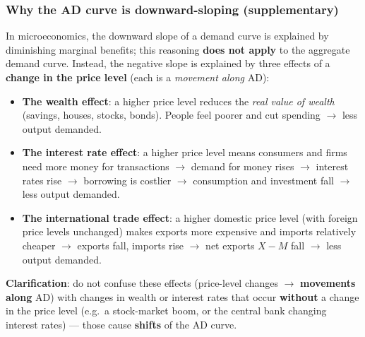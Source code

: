 \subsubsection*{Why the AD curve is downward-sloping (supplementary)}
In microeconomics, the downward slope of a demand curve is explained by diminishing marginal benefits; this reasoning \textbf{does not apply} to the aggregate demand curve. Instead, the negative slope is explained by three effects of a \textbf{change in the price level} (each is a \textit{movement along} AD):
\begin{itemize}
  \item \textbf{The wealth effect}: a higher price level reduces the \textit{real value of wealth} (savings, houses, stocks, bonds). People feel poorer and cut spending $\to$ less output demanded.
  \item \textbf{The interest rate effect}: a higher price level means consumers and firms need more money for transactions $\to$ demand for money rises $\to$ interest rates rise $\to$ borrowing is costlier $\to$ consumption and investment fall $\to$ less output demanded.
  \item \textbf{The international trade effect}: a higher domestic price level (with foreign price levels unchanged) makes exports more expensive and imports relatively cheaper $\to$ exports fall, imports rise $\to$ net exports $X - M$ fall $\to$ less output demanded.
\end{itemize}
\textbf{Clarification}: do not confuse these effects (price-level changes $\to$ \textbf{movements along} AD) with changes in wealth or interest rates that occur \textbf{without} a change in the price level (e.g.\ a stock-market boom, or the central bank changing interest rates) --- those cause \textbf{shifts} of the AD curve.
